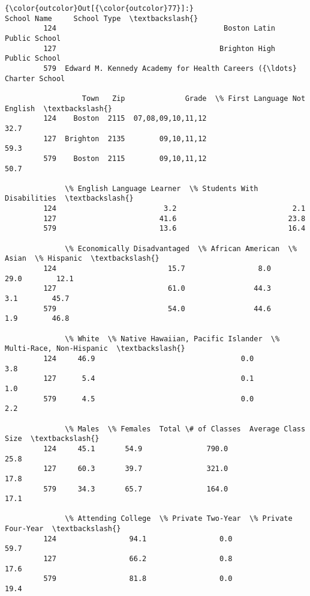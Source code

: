 \documentclass[11pt]{article}
\begin{document}
\begin{Verbatim}[commandchars=\\\{\}]
{\color{outcolor}Out[{\color{outcolor}77}]:}                                            School Name     School Type  \textbackslash{}
         124                                       Boston Latin   Public School   
         127                                      Brighton High   Public School   
         579  Edward M. Kennedy Academy for Health Careers ({\ldots}  Charter School   
         
                  Town   Zip              Grade  \% First Language Not English  \textbackslash{}
         124    Boston  2115  07,08,09,10,11,12                          32.7   
         127  Brighton  2135        09,10,11,12                          59.3   
         579    Boston  2115        09,10,11,12                          50.7   
         
              \% English Language Learner  \% Students With Disabilities  \textbackslash{}
         124                         3.2                           2.1   
         127                        41.6                          23.8   
         579                        13.6                          16.4   
         
              \% Economically Disadvantaged  \% African American  \% Asian  \% Hispanic  \textbackslash{}
         124                          15.7                 8.0     29.0        12.1   
         127                          61.0                44.3      3.1        45.7   
         579                          54.0                44.6      1.9        46.8   
         
              \% White  \% Native Hawaiian, Pacific Islander  \% Multi-Race, Non-Hispanic  \textbackslash{}
         124     46.9                                  0.0                         3.8   
         127      5.4                                  0.1                         1.0   
         579      4.5                                  0.0                         2.2   
         
              \% Males  \% Females  Total \# of Classes  Average Class Size  \textbackslash{}
         124     45.1       54.9               790.0                25.8   
         127     60.3       39.7               321.0                17.8   
         579     34.3       65.7               164.0                17.1   
         
              \% Attending College  \% Private Two-Year  \% Private Four-Year  \textbackslash{}
         124                 94.1                 0.0                 59.7   
         127                 66.2                 0.8                 17.6   
         579                 81.8                 0.0                 19.4   
         

\end{Verbatim}
\end{document}
